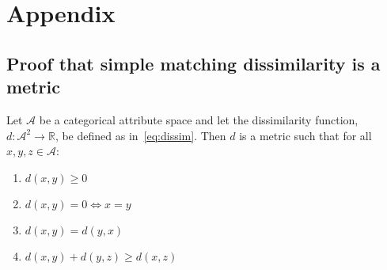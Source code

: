 \appendix\section{Appendix}

\subsection{Proof that simple matching dissimilarity is a metric}

Let \(\mathcal A\) be a categorical attribute space and let the dissimilarity
function, \(d : \mathcal A^2 \to \mathbb R\), be defined as
in~\eqref{eq:dissim}. Then \(d\) is a metric such that for all \(x, y, z \in
\mathcal A\):
\begin{multicols}{2}
    \begin{enumerate}[label=(\roman*)]
        \item \(d\left(x, y\right) \geq 0\)
        \item \(d\left(x, y\right) = 0 \iff x = y\)
        \item \(d\left(x, y\right) = d\left(y, x\right)\)
        \item \(d\left(x, y\right) + d\left(y, z\right) \geq
            d\left(x, z\right)\)
    \end{enumerate}
\end{multicols}

